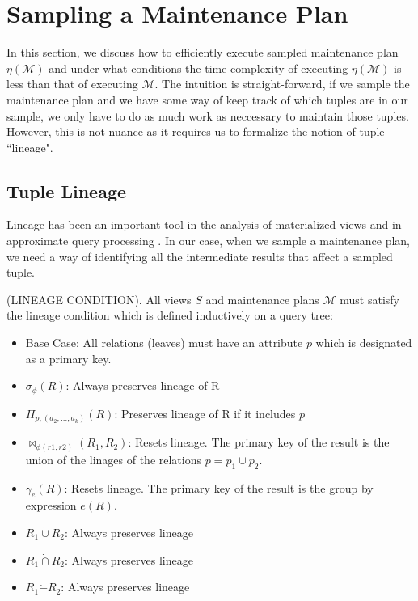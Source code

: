 \section{Sampling a Maintenance Plan}
\label{sampling}
In this section, we discuss how to efficiently execute sampled maintenance plan $\eta(\mathcal{M})$ and under what conditions the time-complexity of executing $\eta(\mathcal{M})$ is less than that of executing $\mathcal{M}$.
The intuition is straight-forward, if we sample the maintenance plan and we have some way of keep track of which tuples are in our sample, we only have to do as much work as neccessary to maintain those tuples. 
However, this is not nuance as it requires us to formalize the notion of tuple ``lineage".

\subsection{Tuple Lineage}
Lineage has been an important tool in the analysis of materialized views \cite{DBLP:journals/vldb/CuiW03} and in approximate query processing \cite{DBLP:conf/sigmod/ZengGMZ14}.
In our case, when we sample a maintenance plan, we need a way of identifying all the intermediate results that affect a sampled tuple.

\begin{definition}
(LINEAGE CONDITION). All views $S$ and maintenance plans $\mathcal{M}$ must satisfy the lineage condition which is defined inductively on a query tree:
\begin{itemize}\vspace{-.45em}
\item Base Case: All relations (leaves) must have an attribute $p$ which is designated as a primary key.\vspace{-.45em}
\item $\sigma_{\phi}(R)$: Always preserves lineage of R \vspace{-.45em}
\item $\Pi_{p,(a_2,...,a_k)}(R)$: Preserves lineage of R if it includes $p$ \vspace{-.45em}
\item $\bowtie_{\phi (r1,r2)}(R_1,R_2)$: Resets lineage. The primary key of the result is the union of the linages of the relations $p= p_1 \cup p_2$.
\item $\gamma_{e}(R)$: Resets lineage. The primary key of the result is the group by expression $e(R)$.\vspace{-.45em}
\item $R_1 \dot{\cup} R_2$: Always preserves lineage
\item $R_1 \dot{\cap} R_2$: Always preserves lineage 
\item $R_1 \dot{-} R_2$: Always preserves lineage 
\end{itemize}
\end{definition}

